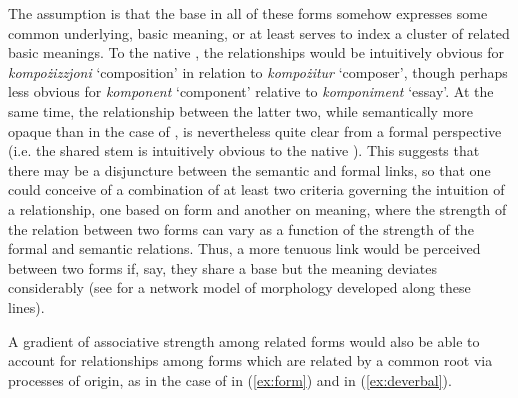 \documentclass[output=paper]{LSP/langsci}
\begin{document}

The assumption is that the base in all of these forms somehow expresses some common underlying, basic meaning, or at least serves to index a cluster of related basic meanings. To the native , the relationships 
would be intuitively obvious for \textit{kompożizzjoni} `composition' in relation to \textit{kompożitur} `composer', though perhaps less obvious for \textit{komponent} `component' relative to \textit{komponiment} `essay'. At the same time, the relationship between the latter two, while semantically more opaque than in the case of , is nevertheless quite clear from a formal perspective (i.e. the shared stem is intuitively obvious to the native ). This suggests that there may be a disjuncture between the semantic and formal links, so that one could conceive of a combination of at least two criteria governing the intuition of a relationship, one based on form and another on meaning, where
the strength of the relation between two forms can vary as a function of the strength of the formal and semantic relations. Thus, a more tenuous link would be perceived between two forms if, say, 
they share a base but the meaning deviates considerably (see \citealt{Bybee1995} for a network model of morphology developed along these lines). 

A gradient of associative strength among related forms would also be able to account for  relationships among forms which are related by a common root via processes of  origin, as in the case of  in (\ref{ex:form}) and  in (\ref{ex:deverbal}). 
\end{document}
